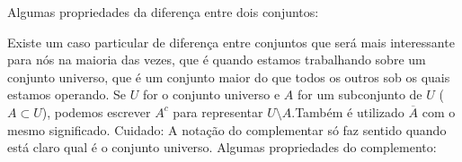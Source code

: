 

 Algumas propriedades da diferença entre dois conjuntos:

Existe um caso particular de diferença entre conjuntos que será mais interessante para nós na maioria das vezes, que é quando estamos trabalhando sobre um conjunto universo, que é um conjunto maior do que todos os outros sob os quais estamos operando. Se $U$ for o conjunto universo e $A$ for um subconjunto de $U$ ($A \subset U$), podemos escrever $A^c$ para representar $U \setminus A$.Também é utilizado $\overline{A}$ com o mesmo significado. Cuidado: A notação do complementar só faz sentido quando está claro qual é o conjunto universo.
Algumas propriedades do complemento:
